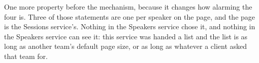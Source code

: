 %
One more property before the mechanism, because it changes how alarming the
four is. Three of those statements are one per speaker on the page, and the
page is the Sessions service's. Nothing in the Speakers service chose it, and
nothing in the Speakers service can see it: this service was handed a list and
the list is as long as another team's default page size, or as long as whatever
a client asked that team for.
